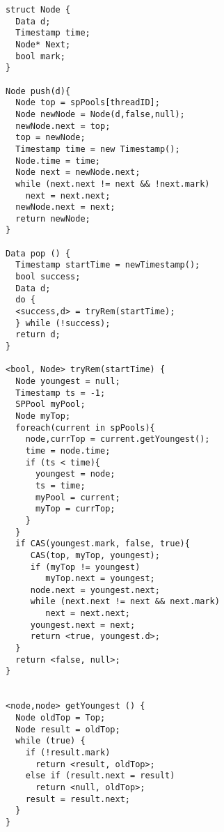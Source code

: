 \begin{lstlisting}
struct Node {
  Data d;
  Timestamp time;
  Node* Next;
  bool mark;
}

Node push(d){
  Node top = spPools[threadID];
  Node newNode = Node(d,false,null);
  newNode.next = top;
  top = newNode;
  Timestamp time = new Timestamp();
  Node.time = time;
  Node next = newNode.next;
  while (next.next != next && !next.mark)
    next = next.next;
  newNode.next = next;
  return newNode;
}	

Data pop () {
  Timestamp startTime = newTimestamp();
  bool success;
  Data d;
  do {
  <success,d> = tryRem(startTime);
  } while (!success);
  return d;
}

<bool, Node> tryRem(startTime) {
  Node youngest = null;
  Timestamp ts = -1;
  SPPool myPool;
  Node myTop;
  foreach(current in spPools){
    node,currTop = current.getYoungest();
    time = node.time;
    if (ts < time){
      youngest = node;
      ts = time;
      myPool = current;
      myTop = currTop;
    }
  }
  if CAS(youngest.mark, false, true){
     CAS(top, myTop, youngest);
     if (myTop != youngest) 
        myTop.next = youngest;
     node.next = youngest.next;
     while (next.next != next && next.mark)
        next = next.next;
     youngest.next = next;
     return <true, youngest.d>;   
  }
  return <false, null>;
}


<node,node> getYoungest () {
  Node oldTop = Top;
  Node result = oldTop;
  while (true) {
    if (!result.mark)
      return <result, oldTop>;
    else if (result.next = result)
      return <null, oldTop>;
    result = result.next;  
  }
}
\end{lstlisting}
